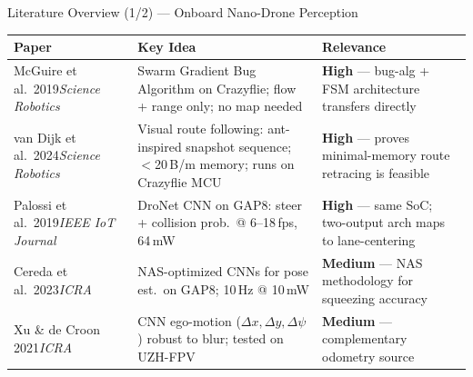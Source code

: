 \documentclass[aspectratio=169, 10pt]{beamer}
\begin{document}
\begin{frame}{Literature Overview (1/2) --- Onboard Nano-Drone Perception}
\begin{table}
\centering\scriptsize
\begin{tabular}{@{}p{2.8cm}p{4.5cm}p{4.5cm}@{}}
\toprule
\textbf{Paper} & \textbf{Key Idea} & \textbf{Relevance} \\
\midrule
McGuire et al.\ 2019\newline \emph{Science Robotics} & Swarm Gradient Bug Algorithm on Crazyflie; flow + range only; no map needed & \textcolor{cbfgreen}{\textbf{High}} --- bug-alg + FSM architecture transfers directly \\
\addlinespace
van Dijk et al.\ 2024\newline \emph{Science Robotics} & Visual route following: ant-inspired snapshot sequence; $<$20\,B/m memory; runs on Crazyflie MCU & \textcolor{cbfgreen}{\textbf{High}} --- proves minimal-memory route retracing is feasible \\
\addlinespace
Palossi et al.\ 2019\newline \emph{IEEE IoT Journal} & DroNet CNN on GAP8: steer + collision prob.\ @ 6--18\,fps, 64\,mW & \textcolor{cbfgreen}{\textbf{High}} --- same SoC; two-output arch maps to lane-centering \\
\addlinespace
Cereda et al.\ 2023\newline \emph{ICRA} & NAS-optimized CNNs for pose est.\ on GAP8; 10\,Hz @ 10\,mW & \textcolor{cnnblue}{\textbf{Medium}} --- NAS methodology for squeezing accuracy \\
\addlinespace
Xu \& de Croon 2021\newline \emph{ICRA} & CNN ego-motion ($\Delta x,\Delta y,\Delta\psi$) robust to blur; tested on UZH-FPV & \textcolor{cnnblue}{\textbf{Medium}} --- complementary odometry source \\
\bottomrule
\end{tabular}
\end{table}
\end{frame}
\end{document}

